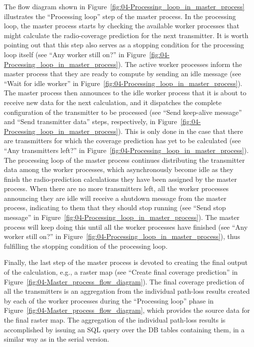 The flow diagram shown in Figure~\ref{fig:04-Processing_loop_in_master_process}
illustrates the ``Processing loop'' step of the master process.
In the processing loop, the master process starts by checking the
available worker processes that might calculate the radio-coverage
prediction for the next transmitter. It is worth pointing out that
this step also serves as a stopping condition for the processing loop
itself (see ``Any worker still on?'' in Figure~\ref{fig:04-Processing_loop_in_master_process}).
The active worker processes inform the master process that they are
ready to compute by sending an idle message (see ``Wait for idle
worker'' in Figure~\ref{fig:04-Processing_loop_in_master_process}).
The master process then announces to the idle worker process that
it is about to receive new data for the next calculation, and it dispatches
the complete configuration of the transmitter to be processed (see
``Send keep-alive message'' and ``Send transmitter data'' steps,
respectively, in Figure~\ref{fig:04-Processing_loop_in_master_process}).
This is only done in the case that there are transmitters for which
the coverage prediction has yet to be calculated (see ``Any transmitters
left?'' in Figure~\ref{fig:04-Processing_loop_in_master_process}).
The processing loop of the master process continues distributing the
transmitter data among the worker processes, which asynchronously
become idle as they finish the radio-prediction calculations they
have been assigned by the master process. When there are no more transmitters
left, all the worker processes announcing they are idle will receive
a shutdown message from the master process, indicating to them that
they should stop running (see ``Send stop message'' in Figure~\ref{fig:04-Processing_loop_in_master_process}).
The master process will keep doing this until all the worker processes
have finished (see ``Any worker still on?'' in Figure~\ref{fig:04-Processing_loop_in_master_process}),
thus fulfilling the stopping condition of the processing loop.

Finally, the last step of the master process is devoted to creating
the final output of the calculation, e.g., a raster map (see ``Create
final coverage prediction'' in Figure~\ref{fig:04-Master_process_flow_diagram}).
The final coverage prediction of all the transmitters is an aggregation
from the individual path-loss results created by each of the worker
processes during the ``Processing loop'' phase in Figure~\ref{fig:04-Master_process_flow_diagram},
which provides the source data for the final raster map. The aggregation
of the individual path-loss results is accomplished by issuing an
SQL query over the DB tables containing them, in a similar way as
in the serial version.


